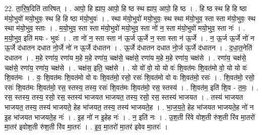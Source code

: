 \documentclass[17pt]{extarticle}
\begin{document}
22. ता॒रि॒ष॒दिति॑ तारिषत् । . आपो॒ हि ह्याप॒ आपो॒ हि ष्ठ स्थ ह्याप॒ आपो॒ हि ष्ठ । . हि ष्ठ स्थ हि हि ष्ठा म॑यो॒भुवो॑ मयो॒भुवः॒ स्थ हि हि ष्ठा म॑यो॒भुवः॑ । . स्था म॑यो॒भुवो॑ मयो॒भुवः॒ स्थ स्था म॑यो॒भुव॒ स्ता स्ता म॑यो॒भुवः॒ स्थ स्था म॑यो॒भुव॒ स्ताः । . म॒यो॒भुव॒ स्ता स्ता म॑यो॒भुवो॑ मयो॒भुव॒ स्ता नो॑ न॒ स्ता म॑यो॒भुवो॑ मयो॒भुव॒ स्ता नः॑ । . म॒यो॒भुव॒ इति॑ मयः - भुवः॑ । . ता नो॑ न॒ स्ता स्ता न॑ ऊ॒र्ज ऊ॒र्जे न॒ स्ता स्ता न॑ ऊ॒र्जे । . न॒ ऊ॒र्ज ऊ॒र्जे नो॑ न ऊ॒र्जे द॑धातन दधात नो॒र्जे नो॑ न ऊ॒र्जे द॑धातन । . ऊ॒र्जे द॑धातन दधात नो॒र्ज ऊ॒र्जे द॑धातन । . द॒धा॒त॒नेति॑ दधातन । . म॒हे रणा॑य॒ रणा॑य म॒हे म॒हे रणा॑य॒ चक्ष॑से॒ चक्ष॑से॒ रणा॑य म॒हे म॒हे रणा॑य॒ चक्ष॑से । . रणा॑य॒ चक्ष॑से॒ चक्ष॑से॒ रणा॑य॒ रणा॑य॒ चक्ष॑से । . चक्ष॑स॒ इति॒ चक्ष॑से । . यो वो॑ वो॒ यो यो वः॑ शि॒वत॑मः शि॒वत॑मो वो॒ यो यो वः॑ शि॒वत॑मः । . वः॒ शि॒वत॑मः शि॒वत॑मो वो वः शि॒वत॑मो॒ रसो॒ रसः॑ शि॒वत॑मो वो वः शि॒वत॑मो॒ रसः॑ । . शि॒वत॑मो॒ रसो॒ रसः॑ शि॒वत॑मः शि॒वत॑मो॒ रस॒ स्तस्य॒ तस्य॒ रसः॑ शि॒वत॑मः शि॒वत॑मो॒ रस॒ स्तस्य॑ । . शि॒वत॑म॒ इति॑ शि॒व - त॒मः॒ । . रस॒ स्तस्य॒ तस्य॒ रसो॒ रस॒ स्तस्य॑ भाजयत भाजयत॒ तस्य॒ रसो॒ रस॒ स्तस्य॑ भाजयत । . तस्य॑ भाजयत भाजयत॒ तस्य॒ तस्य॑ भाजयते॒ हेह भा॑जयत॒ तस्य॒ तस्य॑ भाजयते॒ह । . भा॒ज॒य॒ते॒ हेह भा॑जयत भाजयते॒ह नो॑ न इ॒ह भा॑जयत भाजयते॒ह नः॑ । . इ॒ह नो॑ न इ॒हेह नः॑ । . न॒ इति॑ नः । . उ॒श॒ती रि॑वे वोश॒ती रु॑श॒ती रि॑व मा॒तरो॑ मा॒तर॑ इवोश॒ती रु॑श॒ती रि॑व मा॒तरः॑ । . इ॒व॒ मा॒तरो॑ मा॒तर॑ इवेव मा॒तरः॑ । \newline
\end{document}
